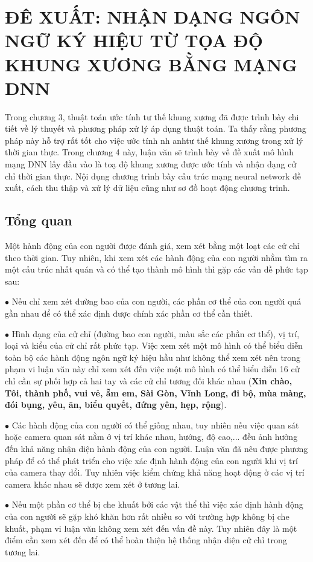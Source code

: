\chapter{ĐÊ XUẤT: NHẬN DẠNG NGÔN NGỮ KÝ HIỆU TỪ TỌA ĐỘ KHUNG XƯƠNG BẰNG MẠNG DNN}
\label{s:DNN}
Trong chương 3, thuật toán ước tính tư thế khung xương đã được trình bày chi tiết về lý thuyết và phương pháp xử lý áp dụng thuật toán. Ta thấy rằng phương pháp này hỗ trợ rất tốt cho việc ước tính nh anhtư thế khung xương trong xử lý thời gian thực. Trong chương 4 này, luận văn sẽ trình bày về đề xuất mô hình mạng DNN lấy đầu vào là toạ độ khung xương được ước tính và nhận dạng cử chỉ thời gian thực. Nội dụng chương trình bày cấu trúc mạng neural network đề xuất, cách thu thập và xử lý dữ liệu cũng như sơ đồ hoạt động chương trinh.
\section{Tổng quan}
Một hành động của con người được đánh giá, xem xét bằng một loạt các cử chỉ theo thời gian. Tuy nhiên, khi xem xét các hành động của con người nhằm tìm ra một cấu trúc nhất quán và có thể tạo thành mô hình thì gặp các vấn đề phức tạp sau:

$\bullet$ Nếu chỉ xem xét đường bao của con người, các phần cơ thể của con người quá gần nhau để có thể xác định được chính xác phần cơ thể cần thiết.

$\bullet$ Hình dạng của cử chỉ (đường bao con người, màu sắc các phần cơ thể), vị trí, loại và kiểu của cử chỉ rất phức tạp. Việc xem xét một mô hình có thể biểu diễn toàn bộ các hành động ngôn ngữ ký hiệu hầu như không thể xem xét nên trong phạm vi luận văn này chỉ xem xét đến việc một mô hình có thể biểu diễn 16 cử chỉ cần sự phối hợp cả hai tay và các cử chỉ tương đối khác nhau (\textbf{Xin chào, Tôi, thành phố, vui vẻ, ẵm em, Sài Gòn, Vĩnh Long, đi bộ, mùa màng, đói bụng, yêu, ăn, biểu quyết, đứng yên, hẹp, rộng}).

$\bullet$ Các hành động của con người có thể giống nhau, tuy nhiên nếu việc quan sát hoặc camera quan sát nằm ở vị trí khác nhau, hướng, độ cao,... đều ảnh hưởng đến khả năng nhận diện hành động của con người. Luận văn đã nêu được phương pháp để có thể phát triển cho việc xác định hành động của con người khi vị trí của camera thay đổi. Tuy nhiên việc kiểm chứng khả năng hoạt động ở các vị trí camera khác nhau sẽ được xem xét ở tương lai.

$\bullet$ Nếu một phần cơ thể bị che khuất bởi các vật thể thì việc xác định hành động của con người sẽ gặp khó khăn hơn rất nhiều so với trường hợp không bị che khuất, phạm vi luận văn không xem xét đến vấn đề này. Tuy nhiên đây là một điểm cần xem xét đến để có thể hoàn thiện hệ thống nhận diện cử chỉ trong tương lai.
